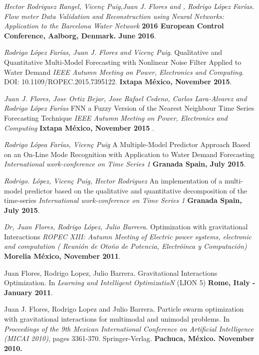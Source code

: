 \documentclass[7pt]{article}
\newenvironment{innerlist}[1][\enskip\textbullet]%
        {\begin{compactitem}[#1]}{\end{compactitem}}
\begin{document}
{\begin{innerlist}
\item \textit{Hector Rodriguez Rangel, Vicen\c{c} Puig,Juan J. Flores and ,  Rodrigo L\'{o}pez Far\'{i}as.  Flow meter Data Validation and Reconstruction using Neural Networks: Application to the Barcelona Water Network} \textbf{2016 European Control Conference, Aalborg, Denmark. June 2016}.

\item \textit{Rodrigo L\'{o}pez Far\'{i}as, Juan J. Flores and Vicen\c{c} Puig}.  Qualitative and Quantitative Multi-Model Forecasting with Nonlinear Noise Filter Applied to Water Demand \textit{IEEE Autumn Meeting on Power, Electronics and Computing}. DOI: 10.1109/ROPEC.2015.7395122.  \textbf{Ixtapa M\'{e}xico, November 2015}.

\item \textit{Juan J. Flores, Jose Ortiz Bejar, Jose Rafael Cedeno, Carlos Lara-Alvarez and Rodrigo L\'{o}pez Far\'{i}as} FNN a Fuzzy Version of the Nearest Neighbour Time Series Forecasting Technique \textit{IEEE Autumn Meeting on Power, Electronics and Computing} \textbf{Ixtapa M\'{e}xico, November 2015 }.

\item \textit{Rodrigo L\'{o}pea Far\'{i}as, Vicen\c{c} Puig}   A Multiple-Model Predictor Approach Based on an On-Line Mode Recognition with Application to Water Demand Forecasting \textit{International work-conference on Time Series 1 
} \textbf{Granada Spain, July 2015}.

\item \textit{Rodrigo. L\'{o}pez, Vicen\c{c} Puig, Hector Rodriguez}   An implementation of a multi-model predictor based on the qualitative and quantitative decomposition of the time-series \textit{International work-conference on Time Series 1 
} \textbf{Granada Spain, July 2015}.

\item \textit{Dr, Juan Flores, Rodrigo López, Julio Barrera.} Optimization with gravitational Interactions  \textit{ROPEC XIII: Autumn Meeting of Electric power systems, electronic and computation ( Reuni\'{o}n de Oto\~no de Potencia, Electr\'{o}inca y Computaci\'{o}n)} \textbf{ Morelia M\'{e}xico, November 2011}.

\item Juan Flores, Rodrigo Lopez, Julio Barrera. Gravitational Interactions Optimization. In \textit{Learning and Intelligent OptimizatioN}  (LION 5) \textbf{Rome, Italy - January 2011}.

\item Juan J. Flores, Rodrigo Lopez and Julio Barrera. Particle swarm optimization with gravitational interactions for multimodal and unimodal problems. In \textit{Proceedings of the 9th Mexican International Conference on Artificial Intelligence (MICAI 2010)}, pages 3361-370. Springer-Verlag. \textbf{Pachuca, México. November 2010.}


\end{innerlist}}
\end{document}
